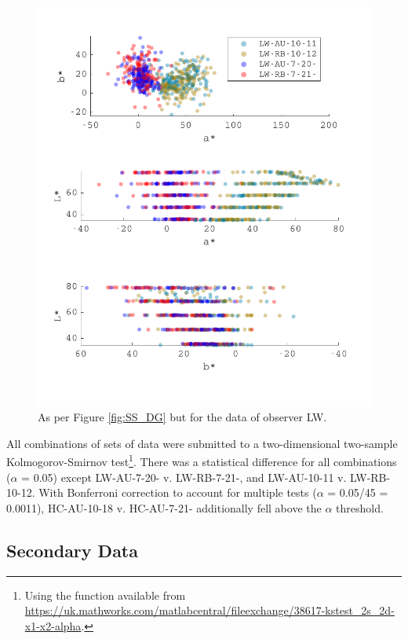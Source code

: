 \begin{figure}[htbp]
\includegraphics[max width=1.2\textwidth,center]{figs/SmallSphere/LW.pdf}
\caption{As per Figure \ref{fig:SS_DG} but for the data of observer LW.}
\label{fig:SS_LW}
\end{figure} 

All combinations of sets of data were submitted to a two-dimensional two-sample Kolmogorov-Smirnov test\footnote{Using the function available from \url{https://uk.mathworks.com/matlabcentral/fileexchange/38617-kstest_2s_2d-x1-x2-alpha}.}. There was a statistical difference for all combinations ($\alpha$ = 0.05) except LW-AU-7-20- v. LW-RB-7-21-, and LW-AU-10-11 v. LW-RB-10-12. With Bonferroni correction to account for multiple tests ($\alpha$ = 0.05/45 = 0.0011), HC-AU-10-18 v. HC-AU-7-21- additionally fell above the $\alpha$ threshold.

\subsection{Secondary Data}

